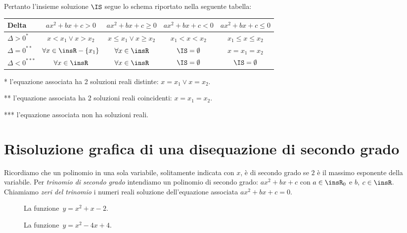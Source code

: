 Pertanto l'insieme soluzione $\IS$ segue lo schema riportato nella seguente tabella:
\begin{center}
\begin{threeparttable}
\begin{tabular}{lcccc}
\toprule
Delta & $ax^2+bx+c>0$& $ax^2+bx+c\ge0$& $ax^2+bx+c<0$ & $ax^2+bx+c\le0$\\
\midrule
 $\Delta >0^{*}$& $ x<x_1\vee x>x_2 $ & $ x\le x_1\vee x\ge x_2 $& $ x_1<x<x_2 $&$ x_1\le x\le x_2 $\\
$\Delta =0^{**}$& $\forall x\in \insR-\{x_1\} $ & $ \forall x\in \insR $& $ \IS=\emptyset $&$ x=x_1=x_2 $\\
$\Delta <0^{***}$&$ \forall x\in \insR $ & $ \forall x\in \insR $& $ \IS=\emptyset $&$ \IS=\emptyset $\\
\bottomrule
\end{tabular}
\begin{tablenotes}
\item [*] l'equazione associata ha 2 soluzioni reali distinte: $x=x_1\vee x=x_2$.
\item [**] l'equazione associata ha 2 soluzioni reali coincidenti: $x=x_1=x_2$.
\item [***] l'equazione associata non ha soluzioni reali.
\end{tablenotes}
\end{threeparttable}
\end{center}

\vspazio\ovalbox{\risolvii \ref{ese:4.1}, \ref{ese:4.2}, \ref{ese:4.3}, \ref{ese:4.4}, \ref{ese:4.5}}

\section{Risoluzione grafica di una disequazione di secondo grado}

Ricordiamo che un polinomio in una sola variabile, solitamente indicata con $x$, è di secondo grado se $2$ è il massimo esponente della variabile. Per \emph{trinomio di secondo grado} intendiamo un polinomio di secondo grado: $ax^2+bx+c$ con $a\in \insR_{0}$ e $b$, $c\in \insR$. Chiamiamo \emph{zeri del trinomio} i numeri reali soluzione dell'equazione associata $ax^2+bx+c=0$.

\begin{figure}[b]
 \begin{minipage}[t]{.45\textwidth}
\centering
 
\caption{La funzione~$y=x^{2}+x-2$.}\label{fig:4.1}
 \end{minipage}\hfil
 \begin{minipage}[t]{.45\textwidth}
\centering
 
\caption{La funzione~$y=x^{2}-4x+4$.}\label{fig:4.2}
 \end{minipage}
\end{figure}

